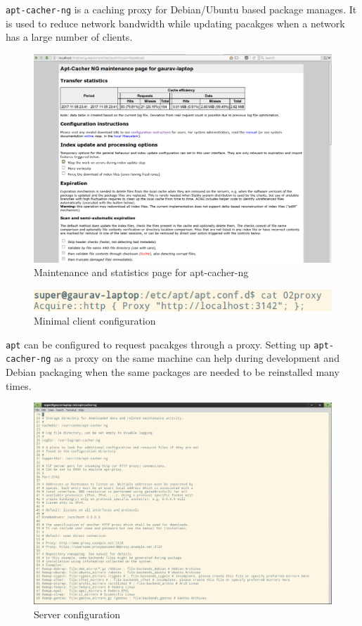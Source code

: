 \documentclass[main.tex]{subfiles}
\begin{document}
\texttt{apt-cacher-ng} is a caching proxy for Debian/Ubuntu based package
manages. It is used to reduce network bandwidth while updating pacakges when a
network has a large number of clients.

\begin{figure}[H]
  \centering
  \includegraphics[width=\textwidth]{maint.png}
  \caption{Maintenance and statistics page for apt-cacher-ng}
\end{figure}

\begin{figure}[H]
  \centering
  \includegraphics[width=\textwidth]{client_config.png}
  \caption{Minimal client configuration}
\end{figure}

\texttt{apt} can be configured to request pacakges through a proxy. Setting up
\texttt{apt-cacher-ng} as a proxy on the same machine can help during
development and Debian packaging when the same packages are needed to be
reinstalled many times.

\begin{figure}[H]
  \centering
  \includegraphics[width=\textwidth]{cache_conf.png}
  \caption{Server configuration}
\end{figure}
\end{document}
